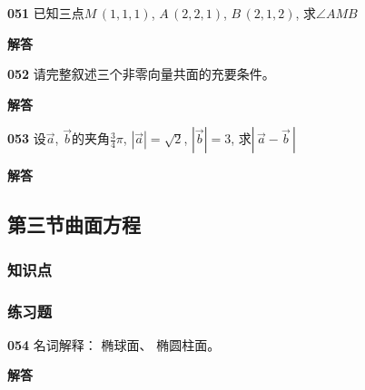 \documentclass[a4paper,10pt]{article} %
\begin{document}


\textheight


\par\noindent \textbf{051} \quad 已知三点$M\,(1,1,1)$, $A\,(2,2,1)$, $B\,(2,1,2)$, 求$\angle AMB$
\par\noindent \textbf{ 解答}





\textheight


\par\noindent \textbf{052} \quad 请完整叙述三个非零向量共面的充要条件。
\par\noindent \textbf{ 解答}





\textheight


\par\noindent \textbf{053} \quad 设$\vec{a}$, $\vec{b}$的夹角$\displaystyle\frac{3}{4}\pi$, 
$|\vec{a}|=\sqrt{2}$, $|\vec{b}|=3$,
求$\left|\,\vec{a}-\vec{b}\,\right|$
\par\noindent \textbf{ 解答}





\textheight


\newpage
\subsection{第三节\quad 曲面方程}
\subsubsection{知识点}
\subsubsection{练习题}
\par\noindent \textbf{054} \quad 名词解释： 椭球面、 椭圆柱面。
\par\noindent \textbf{ 解答}
\end{document}
